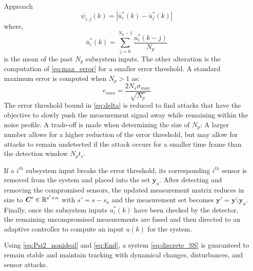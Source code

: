 \begin{section}{Approach}
\begin{equation}
        \label{eq:input_diff2}
        \psi_{i,j}(k)=|\bar{u}^*_i(k)-\bar{u}^*_j(k)|
    \end{equation}
where,
    \begin{equation}
        \label{eq:Average_input}
        \bar{u}^*_i(k) = \sum_{j=0}^{N_p-1} \frac{u^*_i(k-j)}{N_p}
    \end{equation}
is the mean of the past $N_p$ subsystem inputs. The other alteration is the computation of \eqref{eq:max_error} for a smaller error threshold. A standard maximum error is computed when $N_p>1$ as:
    \begin{equation}
	    \label{eq:max_error2}
	    e_{max} = \frac{2N_s\sigma_{max}}{\sqrt{N_p}}
	\end{equation}
The error threshold bound in \eqref{eq:delta} is reduced to find attacks that have the objective to slowly push the measurement signal away while remaining within the noise profile. A trade-off is made when determining the size of $N_p$: A larger number allows for a higher reduction of the error threshold, but may allow for attacks to remain undetected if the attack occurs for a smaller time frame than the detection window $N_pt_s$.

If a $i^{th}$ subsystem input breaks the error threshold, its corresponding $i^{th}$ sensor is removed from the system and placed into the set $\bm{y}_a$. After detecting and removing the compromised sensors, the updated measurement matrix reduces in size to $\bm{C}' \in \mathbb{R}^{s' \times n}$ with $s'=s-s_a$ and the measurement set becomes $\bm{y}' =\bm{y}\setminus\bm{y}_a$. Finally, once the subsystem inputs $u_i^*(k)$ have been checked by the detector, the remaining uncompromised measurements are fused and then directed to an adaptive controller to compute an input $u(k)$ for the system.

\begin{lemma} 
	\label{lemma_1}
	Using \eqref{eq:Psi2_nonideal} and \eqref{eq:End}, a system \eqref{eq:discrete_SS} is guaranteed to remain stable and maintain tracking with dynamical changes, disturbances, and sensor attacks. 

\end{lemma}


\end{section}
